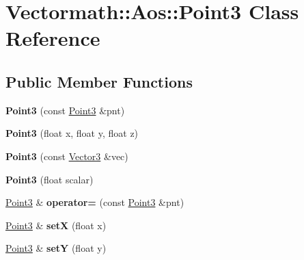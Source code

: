 \hypertarget{classVectormath_1_1Aos_1_1Point3}{}\section{Vectormath\+:\+:Aos\+:\+:Point3 Class Reference}
\label{classVectormath_1_1Aos_1_1Point3}
\subsection*{Public Member Functions}
\begin{DoxyCompactItemize}
\item 
\mbox{\label{classVectormath_1_1Aos_1_1Point3_a03dfaf1fbce8f78dc3569e57034a3fc8}} 
{\bfseries Point3} (const \hyperlink{classVectormath_1_1Aos_1_1Point3}{Point3} \&pnt)
\item 
\mbox{\label{classVectormath_1_1Aos_1_1Point3_a52cee9c70e6d12d50c89d1206d06ceb0}} 
{\bfseries Point3} (float x, float y, float z)
\item 
\mbox{\label{classVectormath_1_1Aos_1_1Point3_a7ede6b811d45cdbe2cc50a5c2c4d5615}} 
{\bfseries Point3} (const \hyperlink{classVectormath_1_1Aos_1_1Vector3}{Vector3} \&vec)
\item 
\mbox{\label{classVectormath_1_1Aos_1_1Point3_a438b318e3c3209422e75f6305873c349}} 
{\bfseries Point3} (float scalar)
\item 
\mbox{\label{classVectormath_1_1Aos_1_1Point3_a719c9c88b5ab1852dc265e65894a031d}} 
\hyperlink{classVectormath_1_1Aos_1_1Point3}{Point3} \& {\bfseries operator=} (const \hyperlink{classVectormath_1_1Aos_1_1Point3}{Point3} \&pnt)
\item 
\mbox{\label{classVectormath_1_1Aos_1_1Point3_a2478cfc20bfe2baf637b1a228442d4b4}} 
\hyperlink{classVectormath_1_1Aos_1_1Point3}{Point3} \& {\bfseries setX} (float x)
\item 
\mbox{\label{classVectormath_1_1Aos_1_1Point3_aa748c24f9e2a1a11e8308e4af111aa4b}} 
\hyperlink{classVectormath_1_1Aos_1_1Point3}{Point3} \& {\bfseries setY} (float y)

\end{DoxyCompactItemize}
